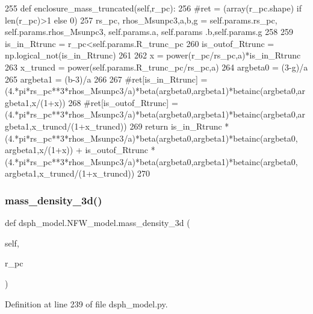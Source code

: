 \begin{DoxyCode}
255     \textcolor{keyword}{def }enclosure\_mass\_truncated(self,r\_pc):
256         \textcolor{comment}{#ret = (array(r\_pc.shape) if len(r\_pc)>1 else 0)}
257         rs\_pc, rhos\_Msunpc3,a,b,g = self.params.rs\_pc, self.params.rhos\_Msunpc3, self.params.a, self.params
      .b,self.params.g
258         
259         is\_in\_Rtrunc = r\_pc<self.params.R\_trunc\_pc
260         is\_outof\_Rtrunc = np.logical\_not(is\_in\_Rtrunc)
261         
262         x = power(r\_pc/rs\_pc,a)*is\_in\_Rtrunc
263         x\_truncd = power(self.params.R\_trunc\_pc/rs\_pc,a)
264         argbeta0 = (3-g)/a
265         argbeta1 = (b-3)/a
266         
267         \textcolor{comment}{#ret[is\_in\_Rtrunc] =
       (4.*pi*rs\_pc**3*rhos\_Msunpc3/a)*beta(argbeta0,argbeta1)*betainc(argbeta0,argbeta1,x/(1+x))}
268         \textcolor{comment}{#ret[is\_outof\_Rtrunc] =
       (4.*pi*rs\_pc**3*rhos\_Msunpc3/a)*beta(argbeta0,argbeta1)*betainc(argbeta0,argbeta1,x\_truncd/(1+x\_truncd))}
269         \textcolor{keywordflow}{return} is\_in\_Rtrunc * (4.*pi*rs\_pc**3*rhos\_Msunpc3/a)*beta(argbeta0,argbeta1)*betainc(argbeta0,
      argbeta1,x/(1+x)) + is\_outof\_Rtrunc * (4.*pi*rs\_pc**3*rhos\_Msunpc3/a)*beta(argbeta0,argbeta1)*betainc(argbeta0,
      argbeta1,x\_truncd/(1+x\_truncd))
270         
\end{DoxyCode}
\mbox{\label{classdsph__model_1_1NFW__model_a77ffcfcaaa6845c611e882dcf59738f2}} 
\subsubsection{\texorpdfstring{mass\+\_\+density\+\_\+3d()}{mass\_density\_3d()}}
{\footnotesize\ttfamily def dsph\+\_\+model.\+N\+F\+W\+\_\+model.\+mass\+\_\+density\+\_\+3d (\begin{DoxyParamCaption}\item[{}]{self,  }\item[{}]{r\+\_\+pc }\end{DoxyParamCaption})}



Definition at line 239 of file dsph\+\_\+model.\+py.


